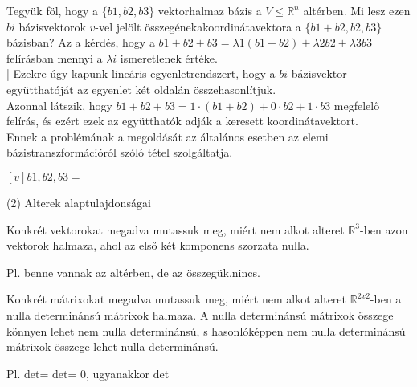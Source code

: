\begin{frame}
  \begin{tcolorbox}[title={1/4. -Q-}]
      Tegyük föl, hogy a $\{b1,b2,b3\}$ vektorhalmaz bázis a $V \leq \mathbb{R}^n$ altérben. Mi lesz ezen $bi$ bázisvektorok $v$-vel jelölt összegénekakoordinátavektora a $\{b1+b2,b2,b3\}$ bázisban?
  \tcblower
    Az a kérdés, hogy a $b1+b2+b3 = {\lambda}1(b1+b2)+{\lambda}2b2+{\lambda}3b3$ felírásban mennyi a ${\lambda}i$ ismeretlenek értéke.\\|
      Ezekre úgy kapunk lineáris egyenletrendszert, hogy a $bi$ bázisvektor együtthatóját az egyenlet két oldalán összehasonlítjuk.\\
      
      Azonnal látszik, hogy $b1 + b2 + b3 = 1 \cdot (b1 + b2) + 0 \cdot b2 + 1 \cdot b3$ megfelelő felírás, és ezért ezek az együtthatók adják a keresett koordinátavektort.\\
      
      Ennek a problémának a megoldását az általános esetben az elemi bázistranszformációról szóló tétel szolgáltatja.
      
   $[v]b1,b2,b3 =$ 
  \end{tcolorbox}
\end{frame}  

\begin{frame}[plain]
\begin{tcolorbox}[center, colback={myyellow}, coltext={black}, colframe={myyellow}]
    {\RHuge  (2) Alterek alaptulajdonságai}
    \mmedskip
\end{tcolorbox}
\end{frame}

\begin{frame}
  \begin{tcolorbox}[title={2/1. -R-}]
      Konkrét vektorokat megadva mutassuk meg, miért nem alkot alteret $\mathbb{R}^3$-ben azon vektorok halmaza, ahol az első két komponens szorzata nulla. 
  \tcblower

    \mmedskip 
  
   Pl. benne vannak az altérben, de az összegük,nincs.
  \end{tcolorbox}
\end{frame}


\begin{frame}
  \begin{tcolorbox}[title={2/2. -Q-}]
      Konkrét mátrixokat megadva mutassuk meg, miért nem alkot alteret $\mathbb{R}^{2 x 2}$-ben a nulla determinánsú mátrixok halmaza. 
  \tcblower
    A nulla determinánsú mátrixok összege könnyen lehet nem nulla determinánsú, s hasonlóképpen nem nulla determinánsú mátrixok összege lehet nulla determinánsú.\\
    \mmedskip 
  
    Pl. det= det= 0, ugyanakkor det
  \end{tcolorbox}
\end{frame}

